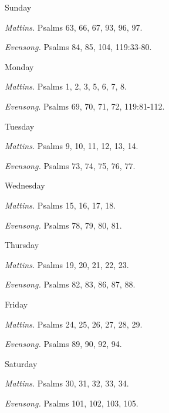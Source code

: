 \begin{paracol}{2}%
	\begin{leftcolumn}
		\begin{inhead}
			Sunday
		\end{inhead}\par\noindent
		\textit{Mattins.} Psalms 63, 66, 67, 93, 96, 97.\par\noindent
		\textit{Evensong.} Psalms 84, 85, 104, 119:33-80.\par
		\begin{inhead}
			Monday
		\end{inhead}\par\noindent
		\textit{Mattins.} Psalms 1, 2, 3, 5, 6, 7, 8.\par\noindent
		\textit{Evensong}. Psalms 69, 70, 71, 72, 119:81-112.\par
		\begin{inhead}
			Tuesday
		\end{inhead}\par\noindent
		\textit{Mattins.} Psalms 9, 10, 11, 12, 13, 14.\par\noindent
		\textit{Evensong.} Psalms 73, 74, 75, 76, 77.\par
		\begin{inhead}
			Wednesday
		\end{inhead}\par\noindent
		\textit{Mattins.} Psalms 15, 16, 17, 18.\par\noindent
		\textit{Evensong.} Psalms 78, 79, 80, 81.\par
		\begin{inhead}
			Thursday
		\end{inhead}\par\noindent
		\textit{Mattins.} Psalms 19, 20, 21, 22, 23.\par\noindent
		\textit{Evensong.} Psalms 82, 83, 86, 87, 88.\par
		\begin{inhead}
			Friday
		\end{inhead}\par\noindent
		\textit{Mattins.} Psalms 24, 25, 26, 27, 28, 29.\par\noindent
		\textit{Evensong.} Psalms 89, 90, 92, 94.\par
		\begin{inhead}
			Saturday
		\end{inhead}\par\noindent
		\textit{Mattins.} Psalms 30, 31, 32, 33, 34.\par\noindent
		\textit{Evensong.} Psalms 101, 102, 103, 105.\par
		

\end{leftcolumn}
\end{paracol}
